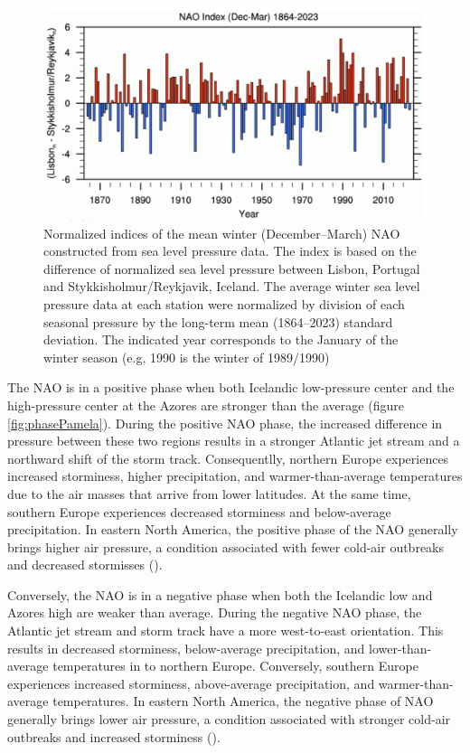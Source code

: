 \documentclass[
]{krantz}
\begin{document}
\begin{figure}

{\centering \includegraphics[width=0.8\linewidth]{work/05_nao/figures/NAOIndex} 

}

\caption{Normalized indices of the mean winter (December–March) NAO constructed from sea level pressure data. The index is based on the difference of normalized sea level pressure between Lisbon, Portugal and Stykkisholmur/Reykjavik, Iceland. The average winter sea level pressure data at each station were normalized by division of each seasonal pressure by the long-term mean (1864–2023) standard deviation. The indicated year corresponds to the January of the winter season (e.g, 1990 is the winter of 1989/1990)}\label{fig:IndexPamela}
\end{figure}

The NAO is in a positive phase when both Icelandic low-pressure center and the high-pressure center at the Azores are stronger than the average (figure \ref{fig:phasePamela}). During the positive NAO phase, the increased difference in pressure between these two regions results in a stronger Atlantic jet stream and a northward shift of the storm track. Consequentlly, northern Europe experiences increased storminess, higher precipitation, and warmer-than-average temperatures due to the air masses that arrive from lower latitudes. At the same time, southern Europe experiences decreased storminess and below-average precipitation. In eastern North America, the positive phase of the NAO generally brings higher air pressure, a condition associated with fewer cold-air outbreaks and decreased stormisses (\citet{hurrell2010}).

Conversely, the NAO is in a negative phase when both the Icelandic low and Azores high are weaker than average. During the negative NAO phase, the Atlantic jet stream and storm track have a more west-to-east orientation. This results in decreased storminess, below-average precipitation, and lower-than-average temperatures in to northern Europe. Conversely, southern Europe experiences increased storminess, above-average precipitation, and warmer-than-average temperatures. In eastern North America, the negative phase of NAO generally brings lower air pressure, a condition associated with stronger cold-air outbreaks and increased storminess (\citet{hurrell2010}).
\end{document}
